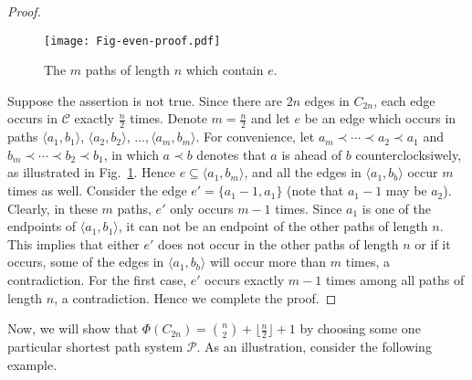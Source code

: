 \documentclass[journal,draftcls,onecolumn,12pt,twoside]{IEEEtran}
\begin{document}
\begin{proof}
\begin{figure}[h]
\centering
\texttt{[image: Fig-even-proof.pdf]}
\caption{The $m$ paths of length $n$ which contain $e$.} 
\label{fig:even-proof}
\end{figure}

Suppose the assertion is not true.
Since there are $2n$ edges in $C_{2n}$, each edge occurs in $\mathcal{C}$ exactly $\frac{n}{2}$ times.
Denote $m=\frac{n}{2}$ and let $e$ be an edge which occurs in paths $\langle a_1,b_1\rangle$, $\langle a_2,b_2\rangle$, $\ldots, \langle a_m,b_m\rangle$.
For convenience, let $a_m\prec\cdots\prec a_2\prec a_1$ and $b_m\prec\cdots\prec b_2\prec b_1$, in which $a\prec b$ denotes that $a$ is ahead of $b$ counterclocksiwely, as illustrated in Fig.~\ref{fig:even-proof}.
Hence $e\subseteq\langle a_1,b_m\rangle$, and all the edges in $\langle a_1,b_b\rangle$ occur $m$ times as well.
Consider the edge $e'=\{a_1-1,a_1\}$ (note that $a_1-1$ may be $a_2$).
Clearly, in these $m$ paths, $e'$ only occurs $m-1$ times.
Since $a_1$ is one of the endpoints of $\langle a_1,b_1\rangle$, it can not be an endpoint of the other paths of length $n$.
This implies that either $e'$ does not occur in the other paths of length $n$ or if it occurs, some of the edges in $\langle a_1,b_b\rangle$ will occur more than $m$ times, a contradiction.
For the first case, $e'$ occurs exactly $m-1$ times among all paths of length $n$, a contradiction.
Hence we complete the proof.
\end{proof}

Now, we will show that $\Phi(C_{2n}) = {n\choose 2}+\lfloor\frac{n}{2}\rfloor+1$ by choosing some one particular shortest path system $\mathcal{P}$.
As an illustration, consider the following example.
\end{document}
